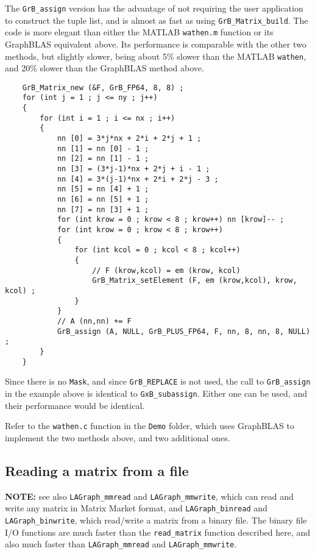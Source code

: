 \documentclass[12pt]{article}
\begin{document}
The \verb'GrB_assign' version has the advantage of not requiring the
user application to construct the tuple list, and is almost as fast as using
\verb'GrB_Matrix_build'.  The code is more elegant than either the MATLAB
\verb'wathen.m' function or its GraphBLAS equivalent above.  Its performance is
comparable with the other two methods, but slightly slower, being about 5\%
slower than the MATLAB \verb'wathen', and 20\% slower than the GraphBLAS
method above.

    {\footnotesize
    \begin{verbatim}
    GrB_Matrix_new (&F, GrB_FP64, 8, 8) ;
    for (int j = 1 ; j <= ny ; j++)
    {
        for (int i = 1 ; i <= nx ; i++)
        {
            nn [0] = 3*j*nx + 2*i + 2*j + 1 ;
            nn [1] = nn [0] - 1 ;
            nn [2] = nn [1] - 1 ;
            nn [3] = (3*j-1)*nx + 2*j + i - 1 ;
            nn [4] = 3*(j-1)*nx + 2*i + 2*j - 3 ;
            nn [5] = nn [4] + 1 ;
            nn [6] = nn [5] + 1 ;
            nn [7] = nn [3] + 1 ;
            for (int krow = 0 ; krow < 8 ; krow++) nn [krow]-- ;
            for (int krow = 0 ; krow < 8 ; krow++)
            {
                for (int kcol = 0 ; kcol < 8 ; kcol++)
                {
                    // F (krow,kcol) = em (krow, kcol)
                    GrB_Matrix_setElement (F, em (krow,kcol), krow, kcol) ;
                }
            }
            // A (nn,nn) += F
            GrB_assign (A, NULL, GrB_PLUS_FP64, F, nn, 8, nn, 8, NULL) ;
        }
    } \end{verbatim}}

Since there is no \verb'Mask', and since \verb'GrB_REPLACE' is not used, the call
to \verb'GrB_assign' in the example above is identical to \verb'GxB_subassign'.
Either one can be used, and their performance would be identical.

Refer to the \verb'wathen.c' function in the \verb'Demo' folder, which
uses GraphBLAS to implement the two methods above, and two additional ones.

\newpage
\subsection{Reading a matrix from a file}
\label{read}

{\bf NOTE:} see also \verb'LAGraph_mmread' and \verb'LAGraph_mmwrite', which
can read and write any matrix in Matrix Market format, and
\verb'LAGraph_binread' and \verb'LAGraph_binwrite', which read/write a matrix
from a binary file.  The binary file I/O functions are much faster than
the \verb'read_matrix' function described here, and also much faster than
\verb'LAGraph_mmread' and \verb'LAGraph_mmwrite'.
\end{document}
